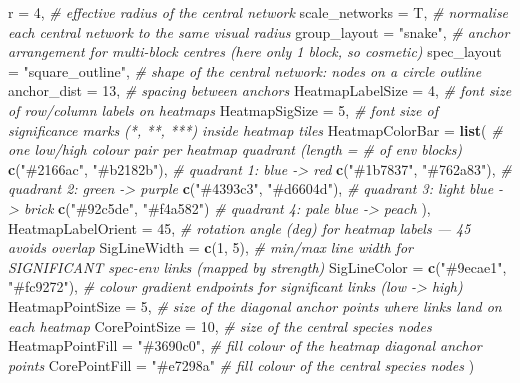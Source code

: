 \documentclass[
]{book}
\newenvironment{Shaded}{\begin{snugshade}}{\end{snugshade}}
\newcommand{\AttributeTok}[1]{\textcolor[rgb]{0.13,0.29,0.53}{#1}}
\newcommand{\CommentTok}[1]{\textcolor[rgb]{0.56,0.35,0.01}{\textit{#1}}}
\newcommand{\DecValTok}[1]{\textcolor[rgb]{0.00,0.00,0.81}{#1}}
\newcommand{\FunctionTok}[1]{\textcolor[rgb]{0.13,0.29,0.53}{\textbf{#1}}}
\newcommand{\NormalTok}[1]{#1}
\newcommand{\StringTok}[1]{\textcolor[rgb]{0.31,0.60,0.02}{#1}}
\begin{document}
\begin{Shaded}
\begin{Highlighting}[]
  \AttributeTok{r                  =} \DecValTok{4}\NormalTok{,                }\CommentTok{\# effective radius of the central network}
  \AttributeTok{scale\_networks     =}\NormalTok{ T,                }\CommentTok{\# normalise each central network to the same visual radius}
  \AttributeTok{group\_layout       =} \StringTok{"snake"}\NormalTok{,          }\CommentTok{\# anchor arrangement for multi{-}block centres (here only 1 block, so cosmetic)}
  \AttributeTok{spec\_layout        =} \StringTok{"square\_outline"}\NormalTok{,    }\CommentTok{\# shape of the central network: nodes on a circle outline}
  \AttributeTok{anchor\_dist        =} \DecValTok{13}\NormalTok{,               }\CommentTok{\# spacing between anchors}
  \AttributeTok{HeatmapLabelSize   =} \DecValTok{4}\NormalTok{,                }\CommentTok{\# font size of row/column labels on heatmaps}
  \AttributeTok{HeatmapSigSize     =} \DecValTok{5}\NormalTok{,                }\CommentTok{\# font size of significance marks (*, **, ***) inside heatmap tiles}
  \AttributeTok{HeatmapColorBar    =} \FunctionTok{list}\NormalTok{(             }\CommentTok{\# one low/high colour pair per heatmap quadrant (length = \# of env blocks)}
    \FunctionTok{c}\NormalTok{(}\StringTok{"\#2166ac"}\NormalTok{, }\StringTok{"\#b2182b"}\NormalTok{),  }\CommentTok{\# quadrant 1: blue {-}\textgreater{} red}
    \FunctionTok{c}\NormalTok{(}\StringTok{"\#1b7837"}\NormalTok{, }\StringTok{"\#762a83"}\NormalTok{),  }\CommentTok{\# quadrant 2: green {-}\textgreater{} purple}
    \FunctionTok{c}\NormalTok{(}\StringTok{"\#4393c3"}\NormalTok{, }\StringTok{"\#d6604d"}\NormalTok{),  }\CommentTok{\# quadrant 3: light blue {-}\textgreater{} brick}
    \FunctionTok{c}\NormalTok{(}\StringTok{"\#92c5de"}\NormalTok{, }\StringTok{"\#f4a582"}\NormalTok{)   }\CommentTok{\# quadrant 4: pale blue {-}\textgreater{} peach}
\NormalTok{  ),}
  \AttributeTok{HeatmapLabelOrient =} \DecValTok{45}\NormalTok{,               }\CommentTok{\# rotation angle (deg) for heatmap labels — 45 avoids overlap}
  \AttributeTok{SigLineWidth       =} \FunctionTok{c}\NormalTok{(}\DecValTok{1}\NormalTok{, }\DecValTok{5}\NormalTok{),          }\CommentTok{\# min/max line width for SIGNIFICANT spec{-}env links (mapped by strength)}
  \AttributeTok{SigLineColor       =} \FunctionTok{c}\NormalTok{(}\StringTok{"\#9ecae1"}\NormalTok{, }\StringTok{"\#fc9272"}\NormalTok{),  }\CommentTok{\# colour gradient endpoints for significant links (low {-}\textgreater{} high)}
  \AttributeTok{HeatmapPointSize   =} \DecValTok{5}\NormalTok{,                }\CommentTok{\# size of the diagonal anchor points where links land on each heatmap}
  \AttributeTok{CorePointSize      =} \DecValTok{10}\NormalTok{,               }\CommentTok{\# size of the central species nodes}
  \AttributeTok{HeatmapPointFill   =} \StringTok{"\#3690c0"}\NormalTok{,        }\CommentTok{\# fill colour of the heatmap diagonal anchor points}
  \AttributeTok{CorePointFill      =} \StringTok{"\#e7298a"}         \CommentTok{\# fill colour of the central species nodes}
\NormalTok{)}
\end{Highlighting}
\end{Shaded}
\end{document}
